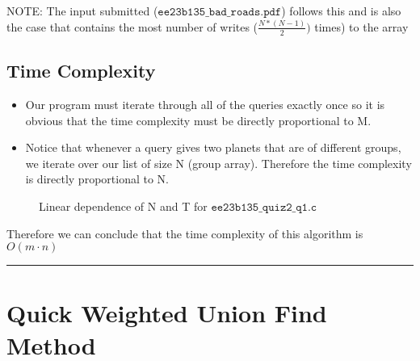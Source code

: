\documentclass[a4paper]{article}
\begin{document}
NOTE: The input submitted ($\texttt{ee23b135\_bad\_roads.pdf}$) follows this and is also the case that contains the most number of writes ($\frac{N * (N-1)}{2})$ times) to the array
\subsection{Time Complexity}
\begin{itemize}
    \item Our program must iterate through all of the queries exactly once so it is obvious that the time complexity must be directly proportional to M.
    \item Notice that whenever a query gives two planets that are of different groups, we iterate over our list of size N (group array). Therefore the time complexity is directly proportional to N.
\end{itemize}

\newpage

\begin{figure}[H]
    \centering
    
    \caption{Linear dependence of N and T for $\texttt{ee23b135\_quiz2\_q1.c}$}
\end{figure}

Therefore we can conclude that the time complexity of this algorithm is $O(m \cdot n)$

\rule{\textwidth}{1pt}

\section{Quick Weighted Union Find Method}
\end{document}
